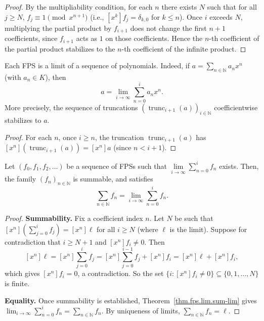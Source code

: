 \begin{proof}
\leanok
By the multipliability condition, for each $n$ there exists $N$ such that
for all $j \geq N$, $f_j \equiv 1 \pmod{x^{n+1}}$ (i.e., $[x^k]f_j = \delta_{k,0}$
for $k \leq n$). Once $i$ exceeds $N$, multiplying the partial product by $f_{i+1}$
does not change the first $n+1$ coefficients, since $f_{i+1}$ acts as $1$
on those coefficients. Hence the $n$-th coefficient of the partial product
stabilizes to the $n$-th coefficient of the infinite product.
\end{proof}

\begin{corollary}
\label{cor.fps.lim.fps-as-pol}
\leantarget
\leanok
Each FPS is a limit of a sequence of
polynomials. Indeed, if $a=\sum_{n\in\mathbb{N}}a_{n}x^{n}$ (with $a_{n}\in
K$), then%
\[
a=\lim\limits_{i\rightarrow\infty}\sum_{n=0}^{i}a_{n}x^{n}.
\]
More precisely, the sequence of truncations $(\operatorname{trunc}_{i+1}(a))_{i \in \mathbb{N}}$
coefficientwise stabilizes to $a$.
\end{corollary}

\begin{proof}
\leanok
For each $n$, once $i \geq n$, the truncation $\operatorname{trunc}_{i+1}(a)$
has $[x^n](\operatorname{trunc}_{i+1}(a)) = [x^n]a$ (since $n < i + 1$).
\end{proof}

\begin{theorem}
\label{thm.fps.lim.sum-lim-conv}
\leantarget
\leanok
Let $\left(  f_{0},f_{1},f_{2},\ldots\right)
$ be a sequence of FPSs such that $\lim\limits_{i\rightarrow\infty}\sum
_{n=0}^{i}f_{n}$ exists. Then, the family $\left(  f_{n}\right)
_{n\in\mathbb{N}}$ is summable, and satisfies%
\[
\sum_{n\in\mathbb{N}}f_{n}=\lim\limits_{i\rightarrow\infty}\sum_{n=0}^{i}%
f_{n}.
\]
\end{theorem}

\begin{proof}
\leanok
\textbf{Summability.} Fix a coefficient index $n$. Let $N$ be such that
$[x^n](\sum_{j=0}^{i} f_j) = [x^n]\ell$ for all $i \geq N$ (where $\ell$
is the limit). Suppose for contradiction that $i \geq N+1$ and $[x^n]f_i \neq 0$.
Then
\[
[x^n]\ell = [x^n]\sum_{j=0}^{i} f_j = [x^n]\sum_{j=0}^{i-1} f_j + [x^n]f_i
= [x^n]\ell + [x^n]f_i,
\]
which gives $[x^n]f_i = 0$, a contradiction. So the set
$\{i : [x^n]f_i \neq 0\} \subseteq \{0, 1, \ldots, N\}$ is finite.

\textbf{Equality.} Once summability is established, Theorem~\ref{thm.fps.lim.sum-lim}
gives $\lim_{i \to \infty} \sum_{n=0}^{i} f_n = \sum_{n \in \mathbb{N}} f_n$.
By uniqueness of limits, $\sum_{n \in \mathbb{N}} f_n = \ell$.
\end{proof}

